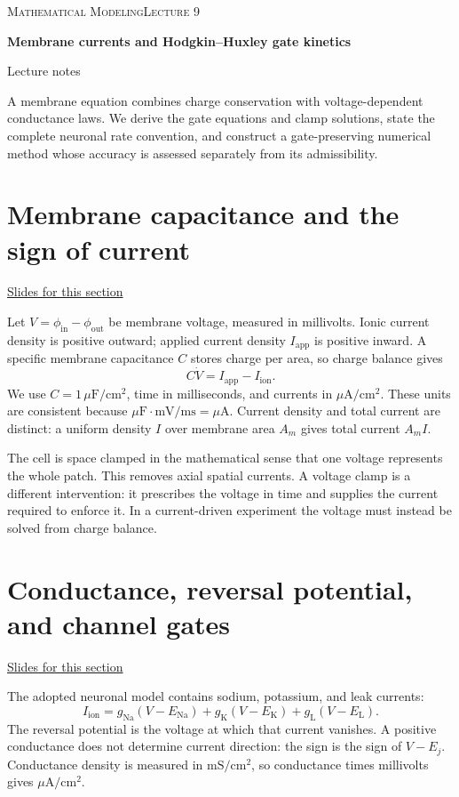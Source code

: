 \documentclass[11pt,letterpaper]{article}
\theoremstyle{definition}\newtheorem{definition}{Definition}\newtheorem{example}{Example}
\numberwithin{equation}{section}
\begin{document}
{\small\scshape Mathematical Modeling\hfill Lecture 9}\par\medskip
{\raggedright{}\LARGE\bfseries\color{ink} Membrane currents and Hodgkin--Huxley gate kinetics\par}\medskip
{\small Lecture notes}\par\bigskip
A membrane equation combines charge conservation with voltage-dependent conductance laws. We derive the gate equations and clamp solutions, state the complete neuronal rate convention, and construct a gate-preserving numerical method whose accuracy is assessed separately from its admissibility.

\section{Membrane capacitance and the sign of current}
\hypertarget{note-membrane-capacitance-and-the-sign-of-current}{}\label{note:membrane-capacitance-and-the-sign-of-current}
{\small \href{slides.html\#frame=membrane-charge-balance\&step=1}{Slides for this section}}\par
Let $V=\phi_{\mathrm{in}}-\phi_{\mathrm{out}}$ be membrane voltage, measured in millivolts. Ionic current density is positive outward; applied current density $I_{\mathrm{app}}$ is positive inward. A specific membrane capacitance $C$ stores charge per area, so charge balance gives
\[
\boxed{C\dot V=I_{\mathrm{app}}-I_{\mathrm{ion}}.}
\]
We use $C=1\,\mu\mathrm F/\mathrm{cm}^2$, time in milliseconds, and currents in $\mu\mathrm A/\mathrm{cm}^2$. These units are consistent because $\mu\mathrm F\cdot\mathrm{mV}/\mathrm{ms}=\mu\mathrm A$. Current density and total current are distinct: a uniform density $I$ over membrane area $A_m$ gives total current $A_m I$.

The cell is space clamped in the mathematical sense that one voltage represents the whole patch. This removes axial spatial currents. A voltage clamp is a different intervention: it prescribes the voltage in time and supplies the current required to enforce it. In a current-driven experiment the voltage must instead be solved from charge balance.
\section{Conductance, reversal potential, and channel gates}
\hypertarget{note-conductance-reversal-potential-and-channel-gates}{}\label{note:conductance-reversal-potential-and-channel-gates}
{\small \href{slides.html\#frame=conductance-and-electrochemical-driving-difference\&step=1}{Slides for this section}}\par
The adopted neuronal model contains sodium, potassium, and leak currents:
\[
I_{\mathrm{ion}}=g_{\mathrm{Na}}(V-E_{\mathrm{Na}})
+g_{\mathrm K}(V-E_{\mathrm K})+g_{\mathrm L}(V-E_{\mathrm L}).
\]
The reversal potential is the voltage at which that current vanishes. A positive conductance does not determine current direction: the sign is the sign of $V-E_j$. Conductance density is measured in $\mathrm{mS}/\mathrm{cm}^2$, so conductance times millivolts gives $\mu\mathrm A/\mathrm{cm}^2$.
\end{document}
